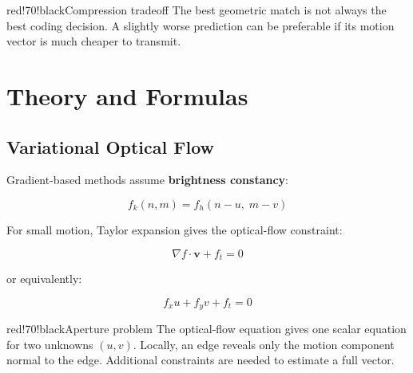 \begin{center}
\end{center}

\begin{calloutbox}{red!70!black}{Compression tradeoff}
The best geometric match is not always the best coding decision. A slightly worse prediction can be preferable if its motion vector is much cheaper to transmit.
\end{calloutbox}

\section{Theory and Formulas}

\subsection{Variational Optical Flow}

Gradient-based methods assume \textbf{brightness constancy}:

\[
f_k(n,m)=f_h(n-u,\;m-v)
\]

For small motion, Taylor expansion gives the optical-flow constraint:

\[
\nabla f \cdot \mathbf{v}+f_t=0
\]

or equivalently:

\[
f_xu+f_yv+f_t=0
\]

\begin{calloutbox}{red!70!black}{Aperture problem}
The optical-flow equation gives one scalar equation for two unknowns $(u,v)$. Locally, an edge reveals only the motion component normal to the edge. Additional constraints are needed to estimate a full vector.
\end{calloutbox}

